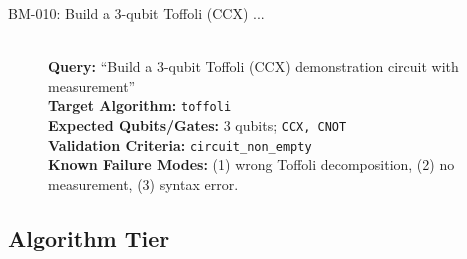 \begin{description}
    \item[BM-010: Build a 3-qubit Toffoli (CCX) ...] \ \\
    \textbf{Query:} ``Build a 3-qubit Toffoli (CCX) demonstration circuit with measurement'' \\
    \textbf{Target Algorithm:} \texttt{toffoli} \\
    \textbf{Expected Qubits/Gates:} 3 qubits; \texttt{CCX, CNOT} \\
    \textbf{Validation Criteria:} \texttt{circuit\_non\_empty} \\
    \textbf{Known Failure Modes:} (1) wrong Toffoli decomposition, (2) no measurement, (3) syntax error.

\end{description}


\subsection*{Algorithm Tier}
